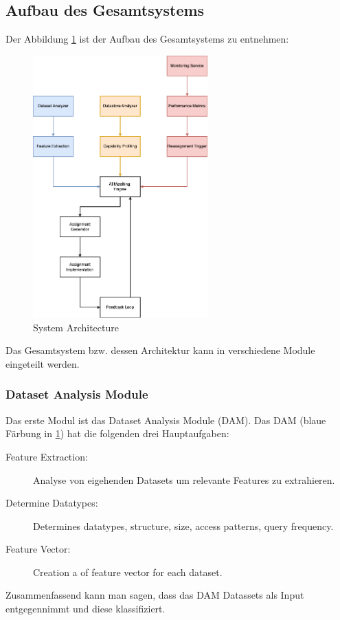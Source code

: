 \subsection{Aufbau des Gesamtsystems}
\label{subsec:main:init:system}
Der Abbildung \ref{fig:architecture} ist der Aufbau des Gesamtsystems zu entnehmen:

\begin{figure}[htbp]
    \centering
    \includegraphics[width=0.60\textwidth]{gfx/examples/master_thesis-architecture.png}
    \caption{System Architecture}
    \label{fig:architecture}
\end{figure} 

Das Gesamtsystem bzw. dessen Architektur kann in verschiedene Module eingeteilt werden.
\subsubsection{Dataset Analysis Module}
\label{ssubsec:main:init:system:dam}
Das erste Modul ist das Dataset Analysis Module (DAM). Das DAM (blaue Färbung in \ref{fig:architecture})
hat die folgenden drei Hauptaufgaben:
\begin{description}
    \item[Feature Extraction:] Analyse von eigehenden Datasets um relevante Features zu extrahieren.
    \item[Determine Datatypes:] Determines datatypes, structure, size, access patterns, query frequency. 
    \item[Feature Vector:] Creation a of feature vector for each dataset. 
\end{description}
Zusammenfassend kann man sagen, dass das DAM Datassets als Input entgegennimmt und diese klassifiziert.
